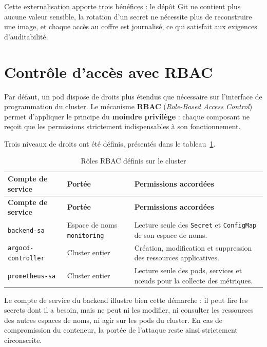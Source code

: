 Cette externalisation apporte trois bénéfices : le dépôt Git ne contient plus aucune
valeur sensible, la rotation d'un secret ne nécessite plus de reconstruire une image, et
chaque accès au coffre est journalisé, ce qui satisfait aux exigences d'auditabilité.

\section{Contrôle d'accès avec RBAC}
Par défaut, un pod dispose de droits plus étendus que nécessaire sur l'interface de
programmation du cluster. Le mécanisme \textbf{RBAC} (\textit{Role-Based Access Control})
permet d'appliquer le principe du \textbf{moindre privilège} : chaque composant ne reçoit
que les permissions strictement indispensables à son fonctionnement.

Trois niveaux de droits ont été définis, présentés dans le tableau~\ref{tab:rbac}.

\renewcommand{\arraystretch}{1.3}
\begin{longtable}{|>{\raggedright\arraybackslash}p{3.8cm}
                  |>{\raggedright\arraybackslash}p{4.4cm}
                  |>{\raggedright\arraybackslash}p{5.6cm}|}
\hline
\textbf{Compte de service} & \textbf{Portée} & \textbf{Permissions accordées} \\
\hline
\endfirsthead

\hline
\textbf{Compte de service} & \textbf{Portée} & \textbf{Permissions accordées} \\
\hline
\endhead

\hline
\caption{Rôles RBAC définis sur le cluster}
\label{tab:rbac}
\endlastfoot

\texttt{backend-sa} & Espace de noms \texttt{monitoring} & Lecture seule des \texttt{Secret} et \texttt{ConfigMap} de son espace de noms. \\
\hline
\texttt{argocd-controller} & Cluster entier & Création, modification et suppression des ressources applicatives. \\
\hline
\texttt{prometheus-sa} & Cluster entier & Lecture seule des pods, services et n\oe uds pour la collecte des métriques. \\
\hline

\end{longtable}

Le compte de service du backend illustre bien cette démarche : il peut lire les secrets
dont il a besoin, mais ne peut ni les modifier, ni consulter les ressources des autres
espaces de noms, ni agir sur les pods du cluster. En cas de compromission du conteneur,
la portée de l'attaque reste ainsi strictement circonscrite.

